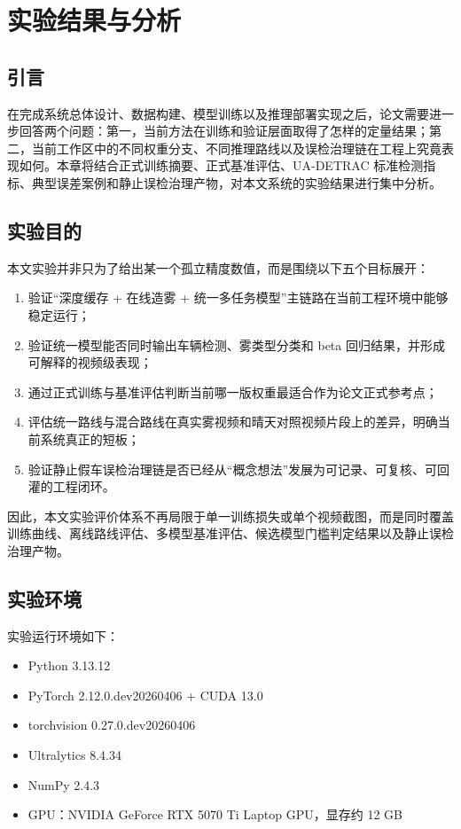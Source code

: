 \chapter{实验结果与分析}

\section{引言}

在完成系统总体设计、数据构建、模型训练以及推理部署实现之后，论文需要进一步回答两个问题：第一，当前方法在训练和验证层面取得了怎样的定量结果；第二，当前工作区中的不同权重分支、不同推理路线以及误检治理链在工程上究竟表现如何。本章将结合正式训练摘要、正式基准评估、UA-DETRAC 标准检测指标、典型误差案例和静止误检治理产物，对本文系统的实验结果进行集中分析。

\section{实验目的}

本文实验并非只为了给出某一个孤立精度数值，而是围绕以下五个目标展开：

\begin{enumerate}[leftmargin=2.5em]
\item 验证“深度缓存 + 在线造雾 + 统一多任务模型”主链路在当前工程环境中能够稳定运行；
\item 验证统一模型能否同时输出车辆检测、雾类型分类和 beta 回归结果，并形成可解释的视频级表现；
\item 通过正式训练与基准评估判断当前哪一版权重最适合作为论文正式参考点；
\item 评估统一路线与混合路线在真实雾视频和晴天对照视频片段上的差异，明确当前系统真正的短板；
\item 验证静止假车误检治理链是否已经从“概念想法”发展为可记录、可复核、可回灌的工程闭环。
\end{enumerate}

因此，本文实验评价体系不再局限于单一训练损失或单个视频截图，而是同时覆盖训练曲线、离线路线评估、多模型基准评估、候选模型门槛判定结果以及静止误检治理产物。

\section{实验环境}

实验运行环境如下：

\begin{itemize}[leftmargin=2em]
\item Python 3.13.12
\item PyTorch 2.12.0.dev20260406 + CUDA 13.0
\item torchvision 0.27.0.dev20260406
\item Ultralytics 8.4.34
\item NumPy 2.4.3
\item GPU：NVIDIA GeForce RTX 5070 Ti Laptop GPU，显存约 12 GB
\end{itemize}

